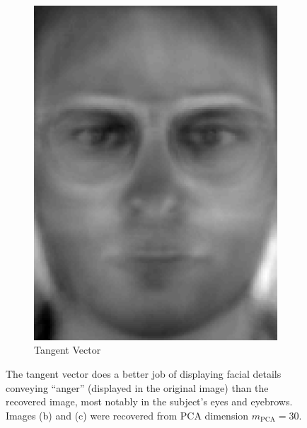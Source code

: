 \documentclass[review]{elsarticle}
\begin{document}
\begin{figure}[H]
\begin{subfigure}[b]{0.18\textwidth}
	\includegraphics[width=\linewidth]{Fig_5c}
		\caption{Tangent Vector}
	\label{fig:tv_ex_3}
	\hfill
\end{subfigure}
\hspace*{\fill}
\caption{The tangent vector does a better job of displaying facial details conveying ``anger'' (displayed in the original image) than the recovered image, most notably in the subject's eyes and eyebrows. Images (b) and (c) were recovered from PCA dimension $m_\mathrm{PCA}=30$.}
\label{fig:AR_PCA_3}
\end{figure}
\end{document}
